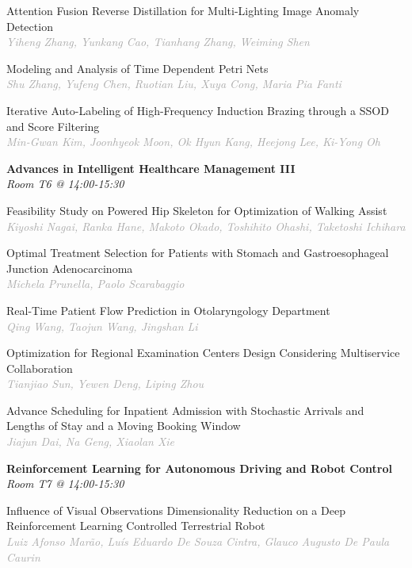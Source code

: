 \begin{multicols*}{2}
\small Attention Fusion Reverse Distillation for Multi-Lighting Image Anomaly Detection\\ 
\footnotesize \textcolor{darkgray}{\textit{Yiheng Zhang, Yunkang  Cao, Tianhang  Zhang, Weiming  Shen}}

\small Modeling and Analysis of Time Dependent Petri Nets\\ 
\footnotesize \textcolor{darkgray}{\textit{Shu Zhang, Yufeng  Chen, Ruotian  Liu, Xuya  Cong, Maria Pia  Fanti}}

\small Iterative Auto-Labeling of High-Frequency Induction Brazing through a SSOD and Score Filtering\\ 
\footnotesize \textcolor{darkgray}{\textit{Min-Gwan Kim, Joonhyeok  Moon, Ok Hyun  Kang, Heejong  Lee, Ki-Yong  Oh}}

\normalsize \textbf{Advances in Intelligent Healthcare Management III}\\
\small \textit{Room T6 @ 14:00-15:30}

\small Feasibility Study on Powered Hip Skeleton for Optimization of Walking Assist\\ 
\footnotesize \textcolor{darkgray}{\textit{Kiyoshi Nagai, Ranka  Hane, Makoto  Okado, Toshihito  Ohashi, Taketoshi  Ichihara}}

\small Optimal Treatment Selection for Patients with Stomach and Gastroesophageal Junction Adenocarcinoma\\ 
\footnotesize \textcolor{darkgray}{\textit{Michela Prunella, Paolo  Scarabaggio}}

\small Real-Time Patient Flow Prediction in Otolaryngology Department\\ 
\footnotesize \textcolor{darkgray}{\textit{Qing Wang, Taojun  Wang, Jingshan  Li}}

\small Optimization for Regional Examination Centers Design Considering Multiservice Collaboration\\ 
\footnotesize \textcolor{darkgray}{\textit{Tianjiao Sun, Yewen  Deng, Liping  Zhou}}

\small Advance Scheduling for Inpatient Admission with Stochastic Arrivals and Lengths of Stay and a Moving Booking Window\\ 
\footnotesize \textcolor{darkgray}{\textit{Jiajun Dai, Na  Geng, Xiaolan  Xie}}

\normalsize \textbf{Reinforcement Learning for Autonomous Driving and Robot Control}\\
\small \textit{Room T7 @ 14:00-15:30}

\small Influence of Visual Observations Dimensionality Reduction on a Deep Reinforcement Learning Controlled Terrestrial Robot\\ 
\footnotesize \textcolor{darkgray}{\textit{Luiz Afonso Marão, Luís Eduardo  De Souza Cintra, Glauco Augusto De Paula  Caurin}}


\end{multicols*}
